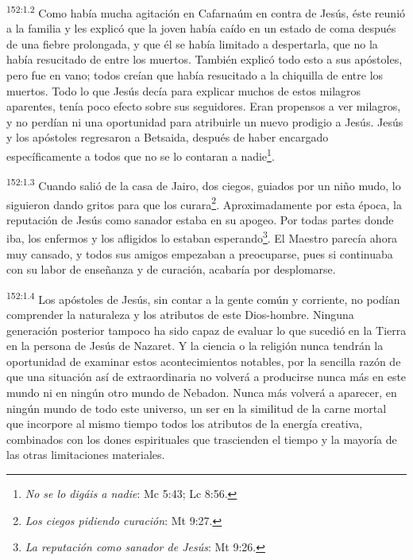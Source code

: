 \par 
\textsuperscript{152:1.2} Como había mucha agitación en Cafarnaúm en contra de Jesús, éste reunió a la familia y les explicó que la joven había caído en un estado de coma después de una fiebre prolongada, y que él se había limitado a despertarla, que no la había resucitado de entre los muertos. También explicó todo esto a sus apóstoles, pero fue en vano; todos creían que había resucitado a la chiquilla de entre los muertos. Todo lo que Jesús decía para explicar muchos de estos milagros aparentes, tenía poco efecto sobre sus seguidores. Eran propensos a ver milagros, y no perdían ni una oportunidad para atribuirle un nuevo prodigio a Jesús. Jesús y los apóstoles regresaron a Betsaida, después de haber encargado específicamente a todos que no se lo contaran a nadie\footnote{\textit{No se lo digáis a nadie}: Mc 5:43; Lc 8:56.}.

\par 
\textsuperscript{152:1.3} Cuando salió de la casa de Jairo, dos ciegos, guiados por un niño mudo, lo siguieron dando gritos para que los curara\footnote{\textit{Los ciegos pidiendo curación}: Mt 9:27.}. Aproximadamente por esta época, la reputación de Jesús como sanador estaba en su apogeo. Por todas partes donde iba, los enfermos y los afligidos lo estaban esperando\footnote{\textit{La reputación como sanador de Jesús}: Mt 9:26.}. El Maestro parecía ahora muy cansado, y todos sus amigos empezaban a preocuparse, pues si continuaba con su labor de enseñanza y de curación, acabaría por desplomarse.

\par 
\textsuperscript{152:1.4} Los apóstoles de Jesús, sin contar a la gente común y corriente, no podían comprender la naturaleza y los atributos de este Dios-hombre. Ninguna generación posterior tampoco ha sido capaz de evaluar lo que sucedió en la Tierra en la persona de Jesús de Nazaret. Y la ciencia o la religión nunca tendrán la oportunidad de examinar estos acontecimientos notables, por la sencilla razón de que una situación así de extraordinaria no volverá a producirse nunca más en este mundo ni en ningún otro mundo de Nebadon. Nunca más volverá a aparecer, en ningún mundo de todo este universo, un ser en la similitud de la carne mortal que incorpore al mismo tiempo todos los atributos de la energía creativa, combinados con los dones espirituales que trascienden el tiempo y la mayoría de las otras limitaciones materiales.

